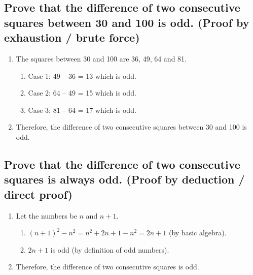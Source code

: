 \documentclass{article}
\begin{document}
\subsection*{Prove that the difference of two consecutive squares between 30 and 100 is odd. (Proof by exhaustion / brute force)}
\begin{enumerate}
    \item The squares between 30 and 100 are 36, 49, 64 and 81.
    \begin{enumerate}
        \item Case 1: 49 – 36 = 13 which is odd.
        \item Case 2: 64 – 49 = 15 which is odd.
        \item Case 3: 81 – 64 = 17 which is odd.
    \end{enumerate}
    \item Therefore, the difference of two consecutive squares
between 30 and 100 is odd.
\end{enumerate}
\vspace{0.1cm}

\subsection*{Prove that the difference of two consecutive squares is always odd. (Proof by deduction / direct proof)}
\begin{enumerate}
    \item Let the numbers be $n$ and $n+1$.
    \begin{enumerate}
        \item $(n+1)^2-n^2=n^2+2n+1-n^2=2n+1$ (by basic algebra).
        \item $2n+1$ is odd (by definition of odd numbers).
    \end{enumerate}
    \item Therefore, the difference of two consecutive squares is odd.
\end{enumerate}
\vspace{0.1cm}
\end{document}
